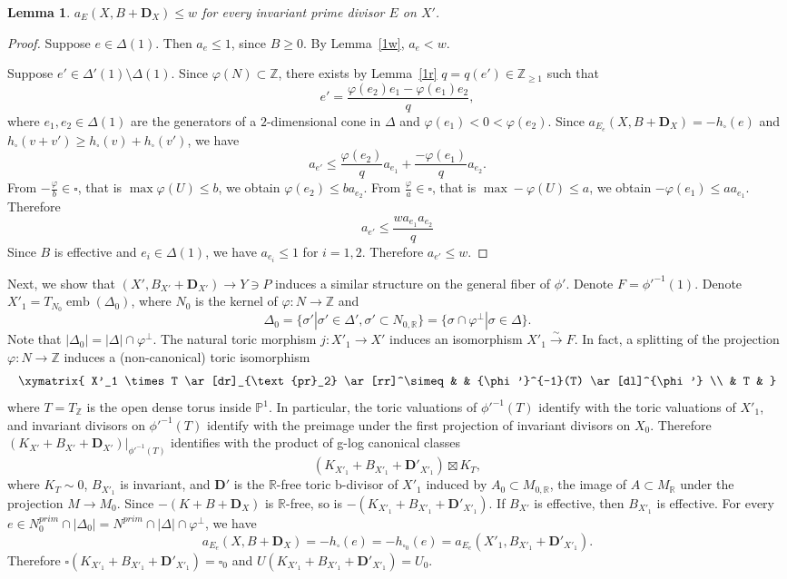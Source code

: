 \documentclass[12pt,twoside]{amsart}
\newcommand{\isoto}{{\overset{\sim}{\rightarrow}}}
\newcommand{\Z}{{\mathbb Z}}
\newcommand{\R}{{\mathbb R}}
\newcommand{\bP}{{\mathbb P}} %
\newcommand{\bD}{{\mathbf D}}
\newcommand{\emb}{\operatorname{emb}}
\theoremstyle{plain}
\newtheorem{lem}[thm]{Lemma}
\theoremstyle{definition}
\theoremstyle{remark}
\begin{document}
\begin{lem}\label{bnda}
	$a_E(X,B+\bD_X)\le w$ for every invariant prime divisor $E$ on $X'$.
\end{lem} 

\begin{proof} 
	
	Suppose $e\in \Delta(1)$. Then $a_e\le 1$, since $B\ge 0$. By Lemma~\ref{1w}, $a_e<w$.
		
	Suppose $e'\in \Delta'(1)\setminus \Delta(1)$. Since $\varphi(N)\subset \Z$,
	there exists by Lemma~\ref{1r} $q=q(e')\in \Z_{\ge 1}$ such that 
	$$
	e'=\frac{ \varphi(e_2) e_1-\varphi(e_1) e_2}{q},
	$$
	where $e_1,e_2\in \Delta(1)$ are the generators of a $2$-dimensional cone in $\Delta$ and 
	$\varphi(e_1)<0< \varphi(e_2)$.
	Since $a_{E_e}(X,B+\bD_X)=-h_\square(e)$ and $h_\square(v+v')\ge h_\square(v)+h_\square(v')$, we have 
	$$
	a_{e'}\le \frac{\varphi(e_2)}{q}a_{e_1}+\frac{-\varphi(e_1)}{q}a_{e_2}.
	$$
	From $-\frac{\varphi}{b}\in \square$, that is $\max \varphi(U)\le b$,
	we obtain $ \varphi(e_2) \le ba_{e_2}$. From $\frac{\varphi}{a}\in \square$, that is 
	$\max -\varphi(U)\le a$, we obtain $ -\varphi(e_1) \le aa_{e_1}$. Therefore
	$$
	a_{e'}\le \frac{wa_{e_1}a_{e_2}}{q}
	$$
	Since $B$ is effective and $e_i\in \Delta(1)$, we have $a_{e_i}\le 1$ for $i=1,2$.
	Therefore $a_{e'}\le w$.
\end{proof}

Next, we show that $(X',B_{X'}+\bD_{X'})\to Y\ni P$ induces a similar structure on 
the general fiber of $\phi'$. Denote $F={\phi'}^{-1}(1)$.
Denote $X'_1=T_{N_0}\emb(\Delta_0)$, where $N_0$ is the kernel of $\varphi\colon N\to \Z$
and 
$$
\Delta_0=\{\sigma'  | \sigma'\in \Delta', \sigma'\subset N_{0,\R} \}=\{\sigma\cap \varphi^\perp  | \sigma\in \Delta \}.
$$
Note that $|\Delta_0|=|\Delta|\cap \varphi^\perp$.
The natural toric morphism $j\colon X'_1 \to X'$ induces an isomorphism $X'_1 \isoto F$. In fact,
a splitting of the projection $\varphi\colon N\to \Z$ induces a (non-canonical) toric isomorphism
\[ \xymatrix{
	X'_1 \times T \ar[dr]_{\text{pr}_2}   \ar[rr]^\simeq &   &   {\phi'}^{-1}(T)  \ar[dl]^{\phi'}  \\
	 & T & 
} \]
where $T=T_\Z$ is the open dense torus inside $\bP^1$. In particular, 
the toric valuations of ${\phi'}^{-1}(T)$ identify with the toric valuations 
of $X'_1$, and invariant divisors on ${\phi'}^{-1}(T)$ identify with the preimage
under the first projection of invariant divisors on $X_0$. Therefore 
$(K_{X'}+B_{X'}+\bD_{X'})|_{  {\phi'}^{-1}(T) }$ identifies with 
the product of g-log canonical classes
$$
(K_{X'_1}+B_{X'_1}+\bD'_{X'_1}) \boxtimes K_T,
$$
where $K_T\sim 0$, $B_{X'_1}$ is invariant, and $\bD'$ is the $\R$-free toric b-divisor of $X'_1$ induced by $A_0 \subset M_{0,\R}$,
the image of $A\subset M_\R$ under the projection $M\to M_0$.
Since $-(K+B+\bD_X)$ is $\R$-free, so is $-(K_{X'_1}+B_{X'_1}+\bD'_{X'_1})$.
If $B_{X'}$ is effective, then $B_{X'_1}$ is effective.
For every $e\in N_0^{prim}\cap |\Delta_0|=N^{prim}\cap |\Delta|\cap \varphi^\perp$, we have 
$$
a_{E_e}(X,B+\bD_X)=-h_\square(e)=-h_{\square_0}(e)=a_{E_e}(X'_1,B_{X'_1}+\bD'_{X'_1}).
$$
Therefore $\square(K_{X'_1}+B_{X'_1}+\bD'_{X'_1})=\square_0$
and $U(K_{X'_1}+B_{X'_1}+\bD'_{X'_1})=U_0$.
\end{document}
